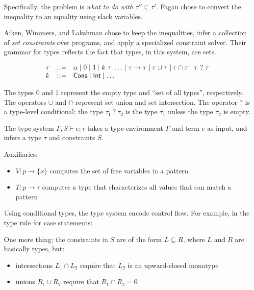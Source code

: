 \documentclass{article}
\begin{document}
Specifically, the problem is \emph{what to do with $\tau'' \subseteq \tau'$}.
Fagan chose to convert the inequality to an equality using slack variables.

Aiken, Wimmers, and Lakshman chose to keep the inequalities, infer a collection
 of \emph{set constraints} over programs, and apply a specialized constraint solver.
Their grammar for types reflects the fact that types, in this system, are sets.

\[\begin{array}{l c l}
   \tau & \coloneq & \alpha \mid 0 \mid 1 \mid k~\tau~\ldots \mid \tau \rightarrow \tau \mid \tau \cup \tau \mid \tau \cap \tau \mid \tau~?~\tau
\\ k & \coloneq & \tcons \mid \tint \mid \ldots
\end{array}\]

The types 0 and 1 represent the empty type and ``set of all types'', respectively.
The operators $\cup$ and $\cap$ represent set union and set intersection.
The operator $?$ is a type-level conditional; the type $\tau_1~?~\tau_2$ is the
 type $\tau_1$ unless the type $\tau_2$ is empty.

The type system $\Gamma, S \vdash e : \tau$ takes a type environment $\Gamma$
 and term $e$ as input, and infers a type $\tau$ and constraints $S$.

Auxiliaries:
\begin{itemize}
\item $V : p \rightarrow \{ x \}$ computes the set of free variables in a pattern
\item $T : p \rightarrow \tau$ computes a type that characterizes all values that can match a pattern
\end{itemize}

Using conditional types, the type system encode control flow.
For example, in the type rule for case statements:

\noindent {}
\begin{mathpar}
\end{mathpar}

One more thing; the constraints in $S$ are of the form $L \subseteq R$,
 where $L$ and $R$ are basically types, but:
\begin{itemize}
\item intersections $L_1 \cap L_2$ require that $L_2$ is an upward-closed monotype
\item unions $R_1 \cup R_2$ require that $R_1 \cap R_2 = 0$
\end{itemize}
\end{document}
